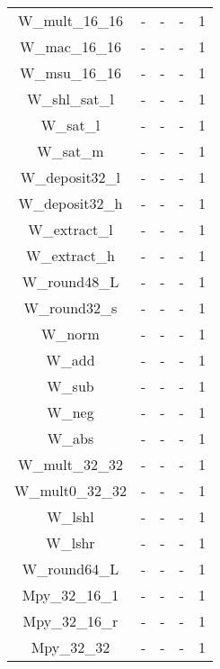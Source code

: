 \begin{longtable}{|c|c|c|c|c|}
W\_mult\_16\_16         & -       & -       & -       & 1        \\
W\_mac\_16\_16          & -       & -       & -       & 1        \\
W\_msu\_16\_16          & -       & -       & -       & 1        \\
W\_shl\_sat\_l          & -       & -       & -       & 1        \\
W\_sat\_l               & -       & -       & -       & 1        \\
W\_sat\_m               & -       & -       & -       & 1        \\
W\_deposit32\_l         & -       & -       & -       & 1        \\
W\_deposit32\_h         & -       & -       & -       & 1        \\
W\_extract\_l           & -       & -       & -       & 1        \\
W\_extract\_h           & -       & -       & -       & 1        \\
W\_round48\_L           & -       & -       & -       & 1        \\
W\_round32\_s           & -       & -       & -       & 1        \\
W\_norm                 & -       & -       & -       & 1        \\
W\_add                  & -       & -       & -       & 1        \\
W\_sub                  & -       & -       & -       & 1        \\
W\_neg                  & -       & -       & -       & 1        \\
W\_abs                  & -       & -       & -       & 1        \\
W\_mult\_32\_32         & -       & -       & -       & 1        \\
W\_mult0\_32\_32        & -       & -       & -       & 1        \\
W\_lshl                 & -       & -       & -       & 1        \\
W\_lshr                 & -       & -       & -       & 1        \\
W\_round64\_L           & -       & -       & -       & 1        \\
Mpy\_32\_16\_1          & -       & -       & -       & 1        \\
Mpy\_32\_16\_r          & -       & -       & -       & 1        \\
Mpy\_32\_32             & -       & -       & -       & 1        \\

\end{longtable}
